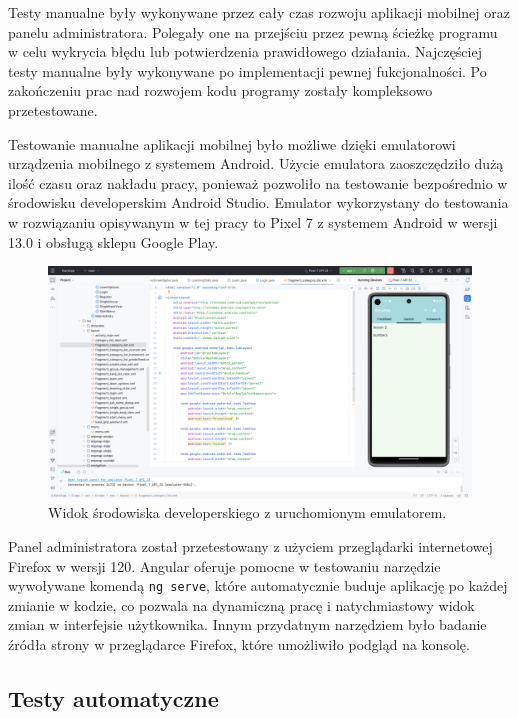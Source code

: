 \documentclass[a4paper,twoside,12pt]{book}
\begin{document}
Testy manualne były wykonywane przez cały czas rozwoju aplikacji mobilnej oraz panelu administratora. Polegały one na przejściu przez pewną ścieżkę programu w celu wykrycia błędu lub potwierdzenia prawidłowego działania. Najczęściej testy manualne były wykonywane po implementacji pewnej fukcjonalności. Po zakończeniu prac nad rozwojem kodu programy zostały kompleksowo przetestowane. 

Testowanie manualne aplikacji mobilnej było możliwe dzięki emulatorowi urządzenia mobilnego z systemem Android. Użycie emulatora zaoszczędziło dużą ilość czasu oraz nakładu pracy, ponieważ pozwoliło na testowanie bezpośrednio w środowisku developerskim Android Studio. Emulator wykorzystany do testowania w rozwiązaniu opisywanym w tej pracy to Pixel 7 z systemem Android w wersji 13.0 i obsługą sklepu Google Play.

\begin{figure}[]
\centering
\includegraphics[width=\textwidth]{androidstudio}
\caption{Widok środowiska developerskiego z uruchomionym emulatorem.}
\label{fig:androidstudio}
\end{figure}

Panel administratora został przetestowany z użyciem przeglądarki internetowej Firefox w wersji 120. Angular oferuje pomocne w testowaniu narzędzie wywoływane komendą \texttt{ng serve}, które automatycznie buduje aplikację po każdej zmianie w kodzie, co pozwala na dynamiczną pracę i natychmiastowy widok zmian w interfejsie użytkownika. Innym przydatnym narzędziem było badanie źródła strony w przeglądarce Firefox, które umożliwiło podgląd na konsolę. 

\subsection{Testy automatyczne}
\end{document}
